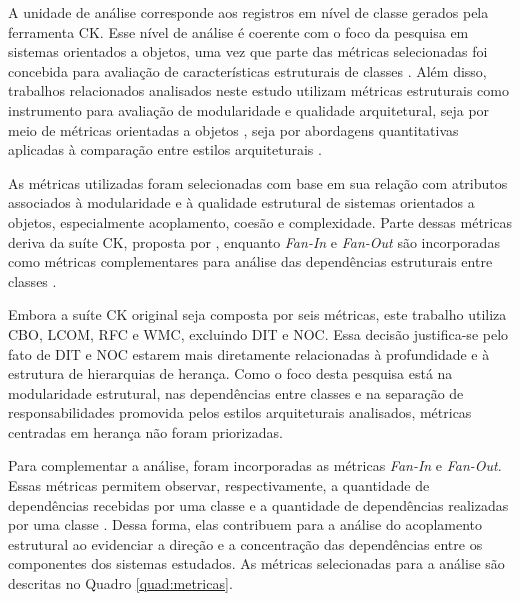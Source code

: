 A unidade de análise corresponde aos registros em nível de classe gerados pela ferramenta CK. Esse nível de análise é coerente com o 
foco da pesquisa em sistemas orientados a objetos, uma vez que parte das métricas selecionadas foi concebida para avaliação de características 
estruturais de classes \cite{chidamber1994}. Além disso, trabalhos relacionados analisados neste estudo utilizam métricas estruturais como 
instrumento para avaliação de modularidade e qualidade arquitetural, seja por meio de métricas orientadas a objetos \cite{ferreira2006}, 
seja por abordagens quantitativas aplicadas à comparação entre estilos arquiteturais \cite{lazzari2022,tsuruta2010}.

As métricas utilizadas foram selecionadas com base em sua relação com atributos associados à modularidade e à qualidade estrutural de sistemas 
orientados a objetos, especialmente acoplamento, coesão e complexidade. Parte dessas métricas deriva da suíte CK, proposta por 
, enquanto \textit{Fan-In} e \textit{Fan-Out} são incorporadas como métricas complementares para análise das dependências 
estruturais entre classes \cite{yourdon1978,sommerville2011}.

Embora a suíte CK original seja composta por seis métricas, este trabalho utiliza CBO, LCOM, RFC e WMC, excluindo DIT e NOC. Essa decisão 
justifica-se pelo fato de DIT e NOC estarem mais diretamente relacionadas à profundidade e à estrutura de hierarquias de herança. Como o 
foco desta pesquisa está na modularidade estrutural, nas dependências entre classes e na separação de responsabilidades promovida pelos 
estilos arquiteturais analisados, métricas centradas em herança não foram priorizadas.

Para complementar a análise, foram incorporadas as métricas \textit{Fan-In} e \textit{Fan-Out}. Essas métricas permitem observar, respectivamente, a quantidade 
de dependências recebidas por uma classe e a quantidade de dependências realizadas por uma classe \cite{yourdon1978,sommerville2011}. Dessa forma,
elas contribuem para a análise do acoplamento estrutural ao evidenciar a direção e a concentração das dependências entre os componentes 
dos sistemas estudados. As métricas selecionadas para a análise são descritas no Quadro \ref{quad:metricas}.

